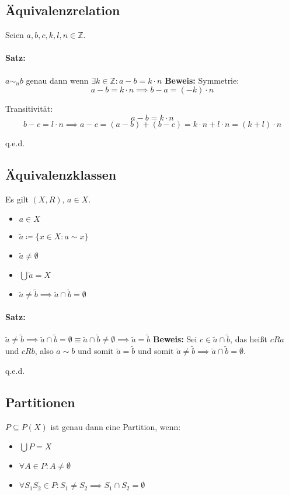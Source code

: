 \documentclass[12pt]{scrreprt}
\newcommand{\theorem}[1]{\paragraph{Satz:} #1\newline}
\newenvironment{proof}
    {\textbf{Beweis:}\newline\indent}
    {\begin{flushright}q.e.d.\end{flushright}}
\begin{document}
            \subsection{Äquivalenzrelation}
                Seien $ a, b, c, k, l, n \in \mathbb{Z} $.

                \theorem{$ a \sim _ n b $ genau dann wenn $ \exists k \in \mathbb{Z} : a - b = k \cdot n $}
                    \begin{proof}
                        Symmetrie:
                        \[ a - b = k \cdot n \implies b - a = (-k) \cdot n \]

                        Transitivität:
                        \[ a - b = k \cdot n \]
                        \[ b - c = l \cdot n \implies a - c = (a - b) + (b - c) = k \cdot n + l \cdot n = (k + l) \cdot n \]
                    \end{proof}


            \subsection{Äquivalenzklassen}
                Es gilt $ (X, R) $, $ a \in X $.

                \begin{itemize}
                    \item $ a \in X $
                    \item $ \tilde{a} \coloneqq \{ x \in X : a \sim x \} $
                    \item $ \tilde{a} \neq \emptyset $
                    \item $ \bigcup \tilde{a} = X $
                    \item $ \tilde{a} \neq \tilde{b} \implies \tilde{a} \cap \tilde{b} = \emptyset $
                \end{itemize}

                \theorem{$ \tilde{a} \neq \tilde{b} \implies \tilde{a} \cap \tilde{b} = \emptyset \equiv \tilde{a} \cap \tilde{b} \neq \emptyset \implies \tilde{a} = \tilde{b} $}
                    \begin{proof}
                        Sei $ c \in \tilde{a} \cap \tilde{b} $, das heißt $ cRa $ und $ cRb $, also $ a \sim b $ und somit $ \tilde{a} = \tilde{b} $ und somit $ \tilde{a} \neq \tilde{b} \implies \tilde{a} \cap \tilde{b} = \emptyset $.
                    \end{proof}


            \subsection{Partitionen}
                $ P \subseteq P(X) $ ist genau dann eine Partition, wenn:
                \begin{itemize}
                    \item $ \bigcup P = X $
                    \item $ \forall A \in P : A \neq \emptyset $
                    \item $ \forall S _ 1 S _ 2 \in P : S _ 1 \neq S _ 2 \implies S _ 1 \cap S _ 2 = \emptyset $
                \end{itemize}
\end{document}
